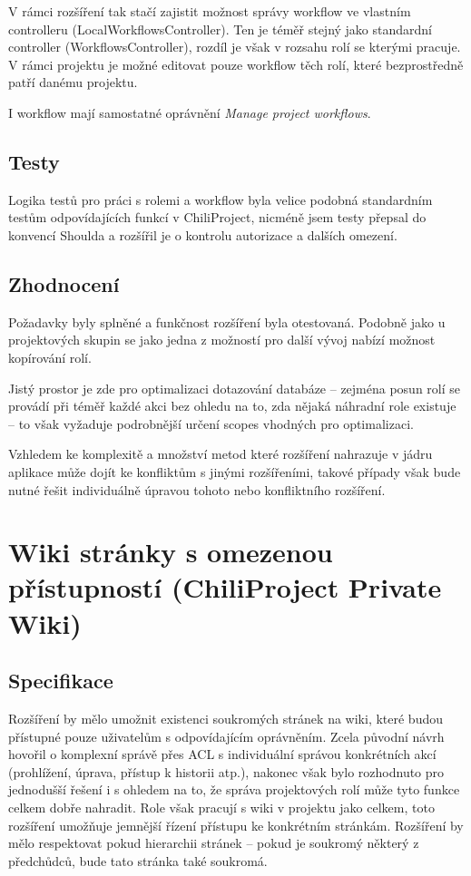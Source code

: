 \documentclass[thesis=B,czech]{FITthesis}[2012/05/02]
\begin{document}
V rámci rozšíření tak stačí zajistit možnost správy workflow ve vlastním
controlleru (LocalWorkflowsController). Ten je téměř stejný jako
standardní controller (WorkflowsController), rozdíl je však v rozsahu
rolí se kterými pracuje. V rámci projektu je možné editovat pouze
workflow těch rolí, které bezprostředně patří danému projektu.

I workflow mají samostatné oprávnění \emph{Manage project workflows}.

\subsection{Testy}

Logika testů pro práci s rolemi a workflow byla velice podobná
standardním testům odpovídajících funkcí v ChiliProject, nicméně jsem
testy přepsal do konvencí Shoulda a rozšířil je o kontrolu autorizace a
dalších omezení.

\subsection{Zhodnocení}

Požadavky byly splněné a funkčnost rozšíření byla otestovaná. Podobně
jako u projektových skupin se jako jedna z možností pro další vývoj
nabízí možnost kopírování rolí.

Jistý prostor je zde pro optimalizaci dotazování databáze -- zejména
posun rolí se provádí při téměř každé akci bez ohledu na to, zda nějaká
náhradní role existuje -- to však vyžaduje podrobnější určení
\glspl{scope} vhodných pro optimalizaci.

Vzhledem ke komplexitě a množství metod které rozšíření nahrazuje
v jádru aplikace může dojít ke konfliktům s jinými rozšířeními, takové
případy však bude nutné řešit individuálně úpravou tohoto nebo
konfliktního rozšíření.

\section[Wiki stránky s omezenou přístupností]{Wiki stránky s omezenou přístupností (ChiliProject Private
Wiki)}
\label{sec:private_wiki}

\subsection{Specifikace}

Rozšíření by mělo umožnit existenci soukromých stránek na \gls{wiki},
které budou přístupné pouze uživatelům s odpovídajícím oprávněním. Zcela
původní návrh hovořil o komplexní správě přes \gls{ACL} s individuální
správou konkrétních akcí (prohlížení, úprava, přístup k historii atp.),
nakonec však bylo rozhodnuto pro jednodušší řešení i s ohledem na to, že
správa projektových rolí může tyto funkce celkem dobře nahradit. Role
však pracují s wiki v projektu jako celkem, toto rozšíření umožňuje
jemnější řízení přístupu ke konkrétním stránkám. Rozšíření by mělo
respektovat pokud hierarchii stránek -- pokud je soukromý některý
z předchůdců, bude tato stránka také soukromá.
\end{document}
